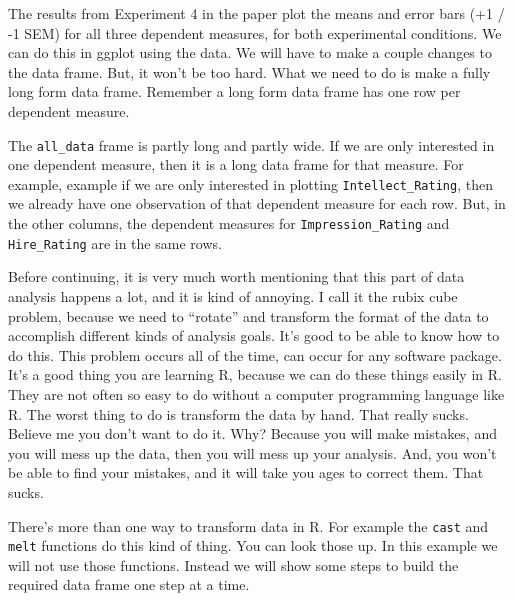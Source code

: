 \documentclass[]{book}
\theoremstyle{definition}
\theoremstyle{definition}
\theoremstyle{definition}
\theoremstyle{remark}
\begin{document}
The results from Experiment 4 in the paper plot the means and error bars
(+1 / -1 SEM) for all three dependent measures, for both experimental
conditions. We can do this in ggplot using the data. We will have to
make a couple changes to the data frame. But, it won't be too hard. What
we need to do is make a fully long form data frame. Remember a long form
data frame has one row per dependent measure.

The \texttt{all\_data} frame is partly long and partly wide. If we are
only interested in one dependent measure, then it is a long data frame
for that measure. For example, example if we are only interested in
plotting \texttt{Intellect\_Rating}, then we already have one
observation of that dependent measure for each row. But, in the other
columns, the dependent measures for \texttt{Impression\_Rating} and
\texttt{Hire\_Rating} are in the same rows.

Before continuing, it is very much worth mentioning that this part of
data analysis happens a lot, and it is kind of annoying. I call it the
rubix cube problem, because we need to ``rotate'' and transform the
format of the data to accomplish different kinds of analysis goals. It's
good to be able to know how to do this. This problem occurs all of the
time, can occur for any software package. It's a good thing you are
learning R, because we can do these things easily in R. They are not
often so easy to do without a computer programming language like R. The
worst thing to do is transform the data by hand. That really sucks.
Believe me you don't want to do it. Why? Because you will make mistakes,
and you will mess up the data, then you will mess up your analysis. And,
you won't be able to find your mistakes, and it will take you ages to
correct them. That sucks.

There's more than one way to transform data in R. For example the
\texttt{cast} and \texttt{melt} functions do this kind of thing. You can
look those up. In this example we will not use those functions. Instead
we will show some steps to build the required data frame one step at a
time.
\end{document}

